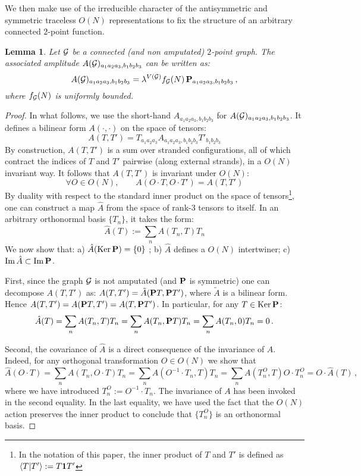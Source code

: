\documentclass[10pt]{article}
\theoremstyle{plain}
\newtheorem{lemma}{Lemma}
\theoremstyle{definition}
\newcommand{\cG}{{\cal G}}
\newcommand{\be}{\begin{equation}}
\newcommand{\ee}{\end{equation}}
\begin{document}
We then make use of the irreducible character of the antisymmetric and symmetric traceless $O(N)$ representations to fix the structure of an arbitrary connected $2$-point function. 
\begin{lemma}\label{lemma:2-point-N}
Let $\cG$ be a connected (and non amputated) $2$-point graph. The associated amplitude $A(\cG)_{a_1 a_2 a_3 , b_1 b_2 b_3}$ can be written as:
\be
A(\cG)_{a_1 a_2 a_3 , b_1 b_2 b_3} = \lambda^{V(\cG)} f_\cG (N) \, {\bf P}_{a_1 a_2 a_3 , b_1 b_2 b_3}\,, \nonumber
\ee
where $f_\cG (N)$ is uniformly bounded.
\end{lemma}
\begin{proof}
In what follows, we use the short-hand $A_{a_1 a_2 a_3 , b_1 b_2 b_3}$ for $A(\cG)_{a_1 a_2 a_3 , b_1 b_2 b_3}$. It defines a bilinear form $A(\cdot , \cdot)$ on the space of tensors: 
$$A(T,T') = T_{a_1 a_2 a_3} A_{a_1 a_2 a_3 , b_1 b_2 b_3} T'_{b_1 b_2 b_3}$$ 
By construction, $A(T,T')$ is a sum over stranded configurations, all of which contract the indices of $T$ and $T'$ pairwise (along external strands), in a $O(N)$ invariant way. It follows that $A(T,T')$ is invariant under $O(N)$: 
$$\forall O \in O(N), \qquad A(O\cdot T  , O \cdot T') = A(T, T')$$
By duality with respect to the standard inner product on the space of tensors\footnote{In the notation of this paper, the inner product of $T$ and $T'$ is defined as $\langle T \vert T' \rangle := T {\bf 1} T'$}, one can construct a map $\hat{A}$ from the space of rank-$3$ tensors to itself. In an arbitrary orthonormal basis $\{ T_n \}$, it takes the form:
$$
\hat{A} (T) := \sum_{n} A(T_n ,T) T_n  
$$
We now show that: a) $\hat{A}(\mathrm{Ker} \, {\bf P}) = \{ 0 \}$ ; b) $\hat{A}$ defines a $O(N)$ intertwiner; c) $\mathrm{Im} \, \hat{A} \subset \mathrm{Im} \, {\bf P}$. 

First, since the graph $\cG$ is not amputated (and ${\bf P}$ is symmetric) one can decompose $A(T,T')$ as: $A(T,T') = \tilde{A} ( {\bf P} T , {\bf P}  T' )$, where $\tilde{A}$ is a bilinear form. Hence $A(T,T')=A({\bf P} T,T') = A(T,{\bf P} T')$. In particular, for any $T \in \mathrm{Ker} \, {\bf P}$:
$$
\hat{A} (T) = \sum_n A(T_n ,  T) T_n = \sum_n A(T_n , {\bf P} T) T_n = \sum_n A(T_n , 0) T_n = 0\,.  
$$

Second, the covariance of $\hat{A}$ is a direct consequence of the invariance of $A$. Indeed, for any orthogonal transformation $O \in O(N)$ we show that
$$ 
\hat{A} (O \cdot T) = \sum_n A(T_n , O \cdot T) T_n = \sum_n A( O^{-1} \cdot T_n , T) T_n = \sum_n A(T_n^O , T) O \cdot T_n^O = O \cdot \hat{A} (T)\,,
$$
where we have introduced $T_n^O := O^{-1} \cdot T_n$. The invariance of $A$ has been invoked in the second equality. In the last equality, we have used the fact that the $O(N)$ action preserves the inner product to conclude that $\{ T_n^O \}$ is an orthonormal basis. 


\end{proof}
\end{document}

